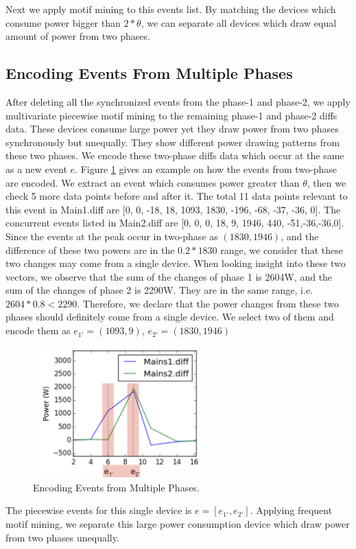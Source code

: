 Next we apply motif mining to this events list. 
By matching the devices which consume power bigger than $2*\theta$, 
we can separate all devices which draw equal amount of power from two phases.  

\subsection{Encoding Events From Multiple Phases}
After deleting all the synchronized events from the phase-1 and phase-2, 
we apply multivariate piecewise motif mining to the remaining phase-1 and phase-2 diffs data. 
These devices consume large power 
yet they draw power from two phases synchronously but unequally. 
They show different power drawing patterns from these two phases.  
We encode these two-phase diffs data which occur at the same as a new event $e$. 
Figure \ref{fig_eventEncoding} gives an example on how the events from two-phase 
are encoded. 
We extract an event which consumes power greater than $\theta$, 
then we check 5 more data points before and after it. 
The total 11 data points relevant to this event in Main1.diff are [0, 0, -18, 18, 1093, 1830, -196, -68, -37, -36, 0]. 
The concurrent events listed in Main2.diff are [0, 0, 0, 18, 9, 1946, 440, -51,-36,-36,0]. 
Since the events at the peak occur in two-phase as $(1830, 1946)$, 
and the difference of these two powers are in the $0.2*1830$ range, 
we consider that these two changes may come from a single device. 
When looking insight into these two vectors, 
we observe that the sum of the changes of phase 1 is 2604W, and the sum of the changes of phase 2 is 2290W. 
They are in the same range, i.e. $2604*0.8 < 2290$. 
Therefore, we declare that the power changes from these two phases should definitely come from a single device. 
We select two of them and encode them as $e_{1'}=(1093, 9)$, $e_{2'}= (1830, 1946)$
\begin{figure}[h]
\centering
\includegraphics[width=0.6\textwidth]{multidisaggfig/synchronizeDifferentEventEncoding.pdf}
\caption{Encoding Events from Multiple Phases.}
\label{fig_eventEncoding}
\end{figure}

The piecewise events for this single device is $e= [e_{1'}, e_{2'}]$. 
Applying frequent motif mining, 
we separate this large power consumption device which draw power from two phases unequally. 



